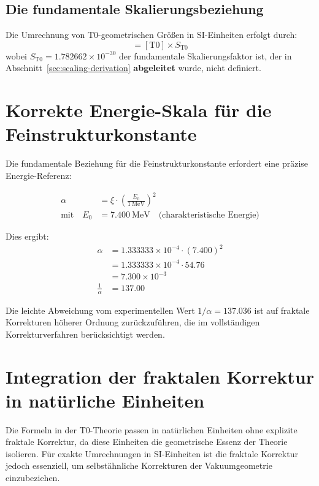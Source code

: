 	\subsection{Die fundamentale Skalierungsbeziehung}
	Die Umrechnung von T0-geometrischen Größen in SI-Einheiten erfolgt durch:
	\begin{equation}
		[\mathrm{SI}] = [\mathrm{T0}] \times S_{\text{T0}}
	\end{equation}
	wobei $S_{\text{T0}} = 1.782662 \times 10^{-30}$ der fundamentale Skalierungsfaktor ist, der in Abschnitt~\ref{sec:scaling-derivation} \textbf{abgeleitet} wurde, nicht definiert.
	
	\section{Korrekte Energie-Skala für die Feinstrukturkonstante}
	
	Die fundamentale Beziehung für die Feinstrukturkonstante erfordert eine präzise Energie-Referenz:
	
	\begin{align}
		\alpha &= \xi \cdot \left( \frac{E_0}{1~\mathrm{MeV}} \right)^2 \\
		\text{mit} \quad E_0 &= 7.400~\mathrm{MeV} \quad \text{(charakteristische Energie)}
	\end{align}
	
	Dies ergibt:
	\begin{align}
		\alpha &= 1.333333 \times 10^{-4} \cdot (7.400)^2 \\
		&= 1.333333 \times 10^{-4} \cdot 54.76 \\
		&= 7.300 \times 10^{-3} \\
		\frac{1}{\alpha} &= 137.00
	\end{align}
	
	Die leichte Abweichung vom experimentellen Wert $1/\alpha = 137.036$ ist auf fraktale Korrekturen höherer Ordnung zurückzuführen, die im vollständigen Korrekturverfahren berücksichtigt werden.
	
	\section{Integration der fraktalen Korrektur in natürliche Einheiten}
	
	Die Formeln in der T0-Theorie passen in natürlichen Einheiten ohne explizite fraktale Korrektur, da diese Einheiten die geometrische Essenz der Theorie isolieren. Für exakte Umrechnungen in SI-Einheiten ist die fraktale Korrektur jedoch essenziell, um selbstähnliche Korrekturen der Vakuumgeometrie einzubeziehen.
	
